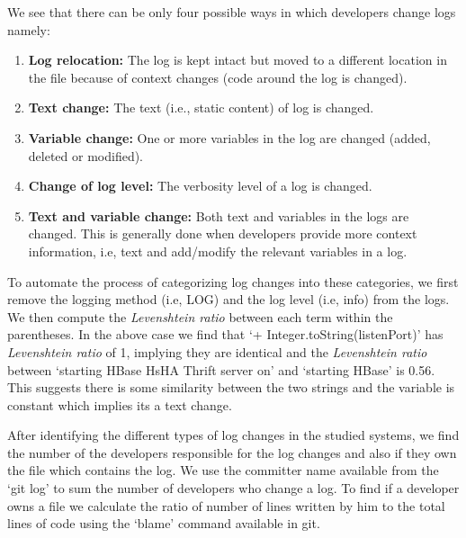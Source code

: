 We see that there can be only four possible ways in which developers change logs namely:
\begin{enumerate}
	
	\item { \textbf{Log relocation:} } The log is kept intact but moved to a different location in the file because of context changes (code around the log is changed).
	
	\item \textbf{Text change:} The text (i.e., static content) of log is changed. 
	
	\item\textbf{Variable change:} One or more variables in the log are changed (added, deleted or modified).
	
	\item \textbf{Change of log level:} The verbosity level of a log is changed.
	
	\item  \textbf{Text and variable change:} Both text and variables in the logs are changed. This is generally done when developers provide more context information, i.e, text and add/modify the relevant variables in a log.
	
\end{enumerate}

To automate the process of categorizing log changes into these categories, we first remove the logging method (i.e, LOG) and the log level (i.e, info) from the logs. We then compute the \textsl{Levenshtein ratio} between each term within the parentheses. In the above case we find that `+ Integer.toString(listenPort)' has \textsl{Levenshtein ratio} of 1, implying they are identical and the \textsl{Levenshtein ratio} between `starting HBase HsHA Thrift server on' and `starting HBase' is 0.56. This suggests there is some similarity between the two strings and the variable is constant which implies its a text change. 

After identifying the different types of log changes in the studied systems, we find the number of the developers responsible for the log changes and also if they own the file which contains the log. We use the committer name available from the `git log' to sum the number of developers who change a log. To find if a developer owns a file we calculate the ratio of number of lines written by him to the total lines of code using the `blame' command available in git. 

